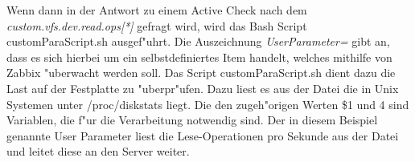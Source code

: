Wenn dann in der Antwort zu einem Active Check nach dem \emph{custom.vfs.dev.read.ops[*]} gefragt wird, wird das Bash Script customParaScript.sh %
ausgef"uhrt. Die Auszeichnung \emph{UserParameter=} gibt an, dass es sich hierbei um ein selbstdefiniertes Item handelt, welches mithilfe von Zabbix %
"uberwacht werden soll. Das Script customParaScript.sh dient dazu die Last auf der Festplatte zu "uberpr"ufen. %
Dazu liest es aus der Datei die in Unix Systemen unter /proc/diskstats liegt. Die den zugeh"origen Werten \$1 und 4 sind Variablen, die f"ur die %
Verarbeitung notwendig sind. Der in diesem Beispiel genannte User Parameter liest die Lese-Operationen pro Sekunde aus der Datei und leitet diese %
an den Server weiter.


